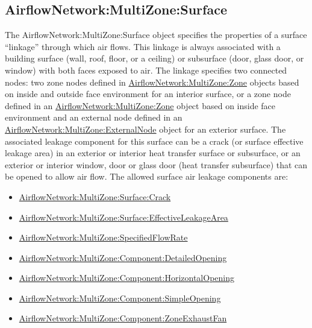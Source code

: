 \subsection{AirflowNetwork:MultiZone:Surface}\label{airflownetworkmultizonesurface}

The AirflowNetwork:MultiZone:Surface object specifies the properties of a surface ``linkage'' through which air flows. This linkage is always associated with a building surface (wall, roof, floor, or a ceiling) or subsurface (door, glass door, or window) with both faces exposed to air. The linkage specifies two connected nodes: two zone nodes defined in \hyperref[airflownetworkmultizonezone]{AirflowNetwork:MultiZone:Zone} objects based on inside and outside face environment for an interior surface, or a zone node defined in an \hyperref[airflownetworkmultizonezone]{AirflowNetwork:MultiZone:Zone} object based on inside face environment and an external node defined in an \hyperref[airflownetworkmultizoneexternalnode]{AirflowNetwork:MultiZone:ExternalNode} object for an exterior surface. The associated leakage component for this surface can be a crack (or surface effective leakage area) in an exterior or interior heat transfer surface or subsurface, or an exterior or interior window, door or glass door (heat transfer subsurface) that can be opened to allow air flow. The allowed surface air leakage components are:

\begin{itemize}
\item
  \hyperref[airflownetworkmultizonesurfacecrack]{AirflowNetwork:MultiZone:Surface:Crack}
\item
  \hyperref[airflownetworkmultizonesurfaceeffectiveleakagearea]{AirflowNetwork:MultiZone:Surface:EffectiveLeakageArea}
\item
  \hyperref[airflownetworkmultizonespecifiedflow]{AirflowNetwork:MultiZone:SpecifiedFlowRate}
\item
  \hyperref[airflownetworkmultizonecomponentdetailedopening]{AirflowNetwork:MultiZone:Component:DetailedOpening}
\item
  \hyperref[airflownetworkmultizonecomponenthorizontalopening]{AirflowNetwork:MultiZone:Component:HorizontalOpening}
\item
  \hyperref[airflownetworkmultizonecomponentsimpleopening]{AirflowNetwork:MultiZone:Component:SimpleOpening}
\item
  \hyperref[airflownetworkmultizonecomponentzoneexhaustfan]{AirflowNetwork:MultiZone:Component:ZoneExhaustFan}
\end{itemize}


